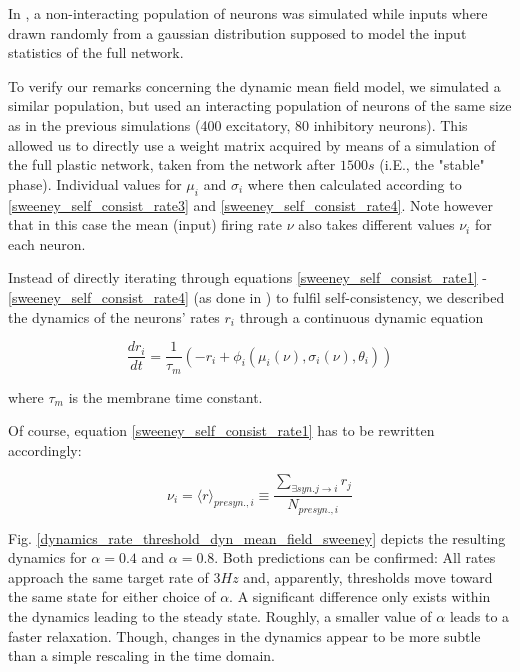 \documentclass[10pt,a4paper]{article}
\begin{document}
In \cite{Sweeney_Paper}, a non-interacting population of neurons was simulated while inputs where drawn randomly from a gaussian distribution supposed to model the input statistics of the full network.

To verify our remarks concerning the dynamic mean field model, we simulated a similar population, but used an interacting population of neurons of the same size as in the previous simulations (400 excitatory, 80 inhibitory neurons). This allowed us to directly use a weight matrix acquired by means of a simulation of the full plastic network, taken from the network after $1500s$ (i.E., the "stable" phase).
Individual values for $\mu_i$ and $\sigma_i$ where then calculated according to \eqref{sweeney_self_consist_rate3} and \eqref{sweeney_self_consist_rate4}. Note however that in this case the mean (input) firing rate $\nu$ also takes different values $\nu_i$ for each neuron.

Instead of directly iterating through equations \eqref{sweeney_self_consist_rate1} - \eqref{sweeney_self_consist_rate4} (as done in \cite{Sweeney_Paper}) to fulfil self-consistency, we described the dynamics of the neurons' rates $r_i$ through a continuous dynamic equation

\begin{equation}
\frac{dr_i}{dt} = \frac{1}{\tau_m} \left( -r_i + \phi_i(\mu_i(\nu),\sigma_i(\nu),\theta_i) \right)
\label{dyn_rate_equation}
\end{equation}

where $\tau_m$ is the membrane time constant.

Of course, equation \eqref{sweeney_self_consist_rate1} has to be rewritten accordingly:

\begin{equation}
\nu_i = {\langle r \rangle}_{presyn.,i} \equiv \frac{\sum_{\exists syn. j\rightarrow i} r_j}{N_{presyn., i}}
\label{sweeney_self_consist_rate1_mod}
\end{equation}

Fig. \ref{dynamics_rate_threshold_dyn_mean_field_sweeney} depicts the resulting dynamics for $\alpha=0.4$ and $\alpha = 0.8$. Both predictions can be confirmed: All rates approach the same target rate of $3Hz$ and, apparently, thresholds move toward the same state for either choice of $\alpha$. A significant difference only exists within the dynamics leading to the steady state. Roughly, a smaller value of $\alpha$ leads to a faster relaxation. Though, changes in the dynamics appear to be more subtle than a simple rescaling in the time domain.
\end{document}
